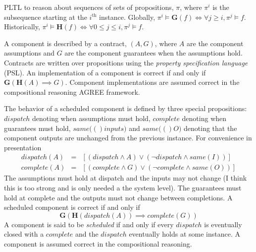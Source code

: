 
\newcommand{\globally}{\ensuremath{\mathbf{G}}}
\newcommand{\historically}{\ensuremath{\mathbf{H}}}
\newcommand{\assumes}{\ensuremath{A}}
\newcommand{\guarantees}{\ensuremath{G}}
\newcommand{\dispatch}{\ensuremath{\mathit{dispatch}}}
\newcommand{\complete}{\ensuremath{\mathit{complete}}}
\newcommand{\same}[1]{\ensuremath{\mathit{same}(#1)}}
\newcommand{\inputs}{\ensuremath{I}}
\newcommand{\outputs}{\ensuremath{O}}
\newcommand{\system}{\ensuremath{S}}
\newcommand{\components}{\ensuremath{C}}
\newcommand{\schedule}{\ensuremath{\phi}}
\newcommand{\valid}{\ensuremath{\mathit{valid}}}

PLTL to reason about sequences of sets of propositions, $\pi$, where $\pi^i$ is the subsequence starting at the $i^\mathrm{th}$ instance.
Globally, $\pi^i \models \globally(f) \iff \forall j \ge i, \pi^j \models f$.
Historically, $\pi^i \models \historically(f) \iff \forall 0 \le j \le i, \pi^j \models f$.

A component is described by a contract, $(\assumes, \guarantees)$, where $\assumes$ are the component assumptions and $\guarantees$ are the component guarantees when the assumptions hold.
Contracts are written over propositions using the \emph{property specification language} (PSL).
An implementation of a component is correct if and only if $\globally(\historically(\assumes) \implies \guarantees)$.
Component implementations are assumed correct in the compositional reasoning AGREE framework.

The behavior of a scheduled component is defined by three special propositions: $\dispatch$ denoting when assumptions must hold, $\complete$ denoting when guarantees must hold, $\same(inputs)$ and $\same(\outputs)$ denoting that the component outputs are unchanged from the previous instance. For convenience in presentation
\begin{eqnarray*}
  \dispatch(A) &=& \left[\left(\dispatch \wedge \assumes\right) \vee \left(\neg\dispatch \wedge \same{\inputs}\right)\right] \\
  \complete(A) &=& \left[\left(\complete \wedge \guarantees\right) \vee \left(\neg\complete \wedge \same{\outputs}\right)\right]
\end{eqnarray*}
The assumptions must hold at dispatch and the inputs may not change (I think this is too strong and is only needed a the system level). 
The guarantees must hold at complete and the outputs must not change between completions.
A scheduled component is correct if and only if
\[
  \globally\left(
    \historically\left(\dispatch(\assumes)\right) \implies \complete(\guarantees) \right)
\]
A component is said to be \emph{scheduled} if and only if every $\dispatch$ is eventually closed with a $\complete$ and the $\dispatch$ eventually holds at some instance.
A component is assumed correct in the compositional reasoning.

